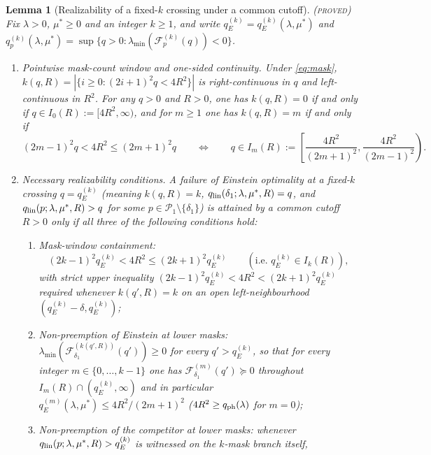 \documentclass[11pt]{article}
\newcommand{\Fcal}{\mathcal F}
\newcommand{\muS}{\mu^{*}}
\newtheorem{lemma}[theorem]{Lemma}
\theoremstyle{definition}
\theoremstyle{remark}
\newcommand{\proved}{\textnormal{\textsc{(proved)}}}
\begin{document}
\begin{lemma}[Realizability of a fixed-$k$ crossing under a common cutoff]
\label{lem:realizable}\proved
Fix $\lambda>0$, $\muS\ge0$ and an integer $k\ge1$, and write
$q_E^{(k)}=q_E^{(k)}(\lambda,\muS)$ and $q_p^{(k)}(\lambda,\muS)=\sup\{q>0:\lambda_{\min}(\Fcal_p^{(k)}(q))<0\}$.
\begin{enumerate}[label=(\roman*),leftmargin=2.2em]
\item \emph{Pointwise mask-count window and one-sided continuity.} Under \eqref{eq:mask},
$k(q,R)=|\{i\ge0:(2i+1)^2q<4R^2\}|$ is right-continuous in $q$ and left-continuous in $R^2$.
For any $q>0$ and $R>0$, one has $k(q,R)=0$ if and only if $q\in I_0(R):=[4R^2,\infty)$,
and for $m\ge1$ one has $k(q,R)=m$ if and only if
\begin{equation}\label{eq:mwindow}
(2m-1)^2q<4R^2\le(2m+1)^2q\qquad\Longleftrightarrow\qquad
q\in I_m(R):=\left[\frac{4R^2}{(2m+1)^2},\frac{4R^2}{(2m-1)^2}\right).
\end{equation}
\item \emph{Necessary realizability conditions.} A failure of Einstein optimality at a
fixed-$k$ crossing $q=q_E^{(k)}$ (meaning $k(q,R)=k$,
$q_{\rm lin}(\delta_1;\lambda,\muS,R)=q$, and $q_{\rm lin}(p;\lambda,\muS,R)>q$ for some
$p\in\mathcal P_1\setminus\{\delta_1\}$) is attained by a common cutoff $R>0$ only if all
three of the following conditions hold:
\begin{enumerate}[label=(\alph*),leftmargin=1.8em]
\item \emph{Mask-window containment:}
\begin{equation}\label{eq:realizable}
(2k-1)^2q_E^{(k)}<4R^2\le(2k+1)^2q_E^{(k)}
\qquad\left(\text{i.e.\ }q_E^{(k)}\in I_k(R)\right),
\end{equation}
with strict upper inequality $(2k-1)^2q_E^{(k)}<4R^2<(2k+1)^2q_E^{(k)}$ required whenever
$k(q',R)=k$ on an open left-neighbourhood $(q_E^{(k)}-\delta,q_E^{(k)})$;
\item \emph{Non-preemption of Einstein at lower masks:}
$\lambda_{\min}(\Fcal_{\delta_1}^{(k(q',R))}(q'))\ge0$ for every $q'>q_E^{(k)}$, so that
for every integer $m\in\{0,\dots,k-1\}$ one has $\Fcal_{\delta_1}^{(m)}(q')\succeq0$
throughout $I_m(R)\cap(q_E^{(k)},\infty)$ and in particular
$q_E^{(m)}(\lambda,\muS)\le4R^2/(2m+1)^2$ ($4R^2\ge q_{\rm ph}(\lambda)$ for $m=0$);
\item \emph{Non-preemption of the competitor at lower masks:} whenever
$q_{\rm lin}(p;\lambda,\muS,R)>q_E^{(k)}$ is witnessed on the $k$-mask branch itself,

\end{enumerate}
\end{enumerate}
\end{lemma}
\end{document}
